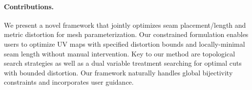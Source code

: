 \paragraph*{Contributions.} 
We present a novel framework that jointly optimizes seam placement/length and metric distortion for mesh parameterization. %
Our constrained formulation %
enables users to optimize UV maps with specified distortion bounds and %
locally-minimal seam length without manual intervention.
%
Key to our method are topological search strategies as well as a dual variable treatment searching for optimal cuts with bounded distortion. Our framework naturally handles global bijectivity constraints and incorporates user guidance. 
